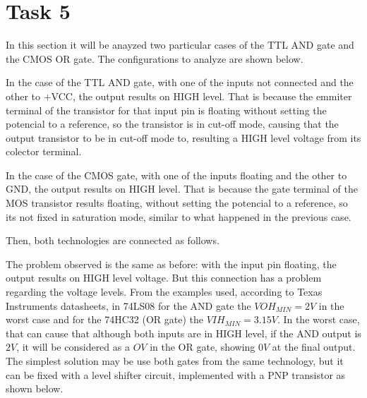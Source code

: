 \newpage 

\section*{Task 5}
In this section it will be anayzed two particular cases of the TTL AND gate and the CMOS OR gate.
The configurations to analyze are shown below.


In the case of the TTL AND gate, with one of the inputs not connected and the other to +VCC,
 the output results on HIGH level. 
That is because the emmiter terminal of the transistor for that input pin is floating without setting 
the potencial to a reference, so the transistor is in cut-off mode, causing that the output 
transistor to be in cut-off mode to, resulting a HIGH level voltage from its colector terminal.

In the case of the CMOS gate, with one of the inputs floating and the other to GND, the output results 
on HIGH level.
That is because the gate terminal of the MOS transistor results floating, without setting the potencial
to a reference, so its not fixed in saturation mode, similar to what happened in the previous case.

Then, both technologies are connected as follows.


The problem observed is the same as before: with the input pin floating, the output results on HIGH
level voltage. But this connection has a problem regarding the voltage levels. From the examples used, 
according to Texas Instruments datasheets, 
in 74LS08 for the AND gate the $VOH_{MIN}=2V$ in the worst case and for the 74HC32 (OR gate) the $VIH_{MIN}=3.15V$.
In the worst case, that can cause that although both inputs are in HIGH level, if the AND output is $2V$, 
it will be considered as a $OV$ in the OR gate, showing $0V$ at the final output.
The simplest solution may be use both gates from the same technology, but it can be fixed with a 
level shifter circuit, implemented with a PNP transistor as shown below.

